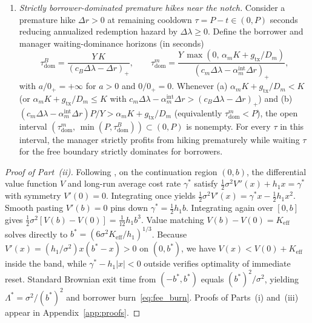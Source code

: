 \begin{theorem}
\begin{enumerate}[label=(\roman*), leftmargin=2.2em, itemsep=2pt]
\begin{equation}\label{eq:fee_burn}
K\,\Lambda^* = K\left(\frac{h_1^2 \sigma^2}{36\,(\alpha_m K + g_{\mathrm{tx}}/D_m)^2}\right)^{1/3} \propto \alpha_m^{-2/3} \xrightarrow{\alpha_m \downarrow 0^+} K\left(\frac{h_1^2 \sigma^2 D_m^2}{36\,g_{\mathrm{tx}}^2}\right)^{1/3}.
\end{equation}
\item \emph{Strictly borrower-dominated premature hikes near the notch.} Consider a premature hike $\Delta r > 0$ at remaining cooldown $\tau = P - t \in (0, P)$ seconds reducing annualized redemption hazard by $\Delta\lambda \ge 0$. Define the borrower and manager waiting-dominance horizons (in seconds)
\begin{equation}\label{eq:tau_dom}
\tau_{\mathrm{dom}}^B = \frac{Y\,K}{(c_B \Delta\lambda - \Delta r)_+}, \qquad \tau_{\mathrm{dom}}^m = \frac{Y\,\max(0,\, \alpha_m K + g_{\mathrm{tx}}/D_m)}{(c_m \Delta\lambda - \alpha_m^{\mathrm{int}}\Delta r)_+},
\end{equation}
with $a/0_+ = +\infty$ for $a > 0$ and $0/0_+ = 0$. Whenever \textup{(a)} $\alpha_m K + g_{\mathrm{tx}}/D_m < K$ (or $\alpha_m K + g_{\mathrm{tx}}/D_m \le K$ with $c_m \Delta\lambda - \alpha_m^{\mathrm{int}}\Delta r > (c_B\Delta\lambda - \Delta r)_+$) and \textup{(b)} $(c_m \Delta\lambda - \alpha_m^{\mathrm{int}}\Delta r)P/Y > \alpha_m K + g_{\mathrm{tx}}/D_m$ (equivalently $\tau_{\mathrm{dom}}^m < P$), the open interval $(\tau_{\mathrm{dom}}^m,\, \min(P, \tau_{\mathrm{dom}}^B)) \subset (0, P)$ is nonempty. For every $\tau$ in this interval, the manager strictly profits from hiking prematurely while waiting $\tau$ for the free boundary strictly dominates for borrowers.
\end{enumerate}
\end{theorem}

\begin{proof}[Proof of Part~(ii)]
Following \citet{harrison1983sellke}, on the continuation region $(0, b)$, the differential value function $V$ and long-run average cost rate $\gamma^*$ satisfy $\frac{1}{2}\sigma^2 V''(x) + h_1 x = \gamma^*$ with symmetry $V'(0) = 0$. Integrating once yields $\frac{1}{2}\sigma^2 V'(x) = \gamma^* x - \frac{1}{2}h_1 x^2$. Smooth pasting $V'(b) = 0$ pins down $\gamma^* = \frac{1}{2}h_1 b$. Integrating again over $[0, b]$ gives $\frac{1}{2}\sigma^2[V(b) - V(0)] = \frac{1}{12}h_1 b^3$. Value matching $V(b) - V(0) = K_{\mathrm{eff}}$ solves directly to $b^* = (6\sigma^2 K_{\mathrm{eff}}/h_1)^{1/3}$. Because $V'(x) = (h_1/\sigma^2)x(b^* - x) > 0$ on $(0, b^*)$, we have $V(x) < V(0) + K_{\mathrm{eff}}$ inside the band, while $\gamma^* - h_1|x| < 0$ outside verifies optimality of immediate reset. Standard Brownian exit time from $(-b^*, b^*)$ equals $(b^*)^2/\sigma^2$, yielding $\Lambda^* = \sigma^2/(b^*)^2$ and borrower burn~\eqref{eq:fee_burn}. Proofs of Parts~(i) and~(iii) appear in Appendix~\ref{app:proofs}.
\end{proof}


